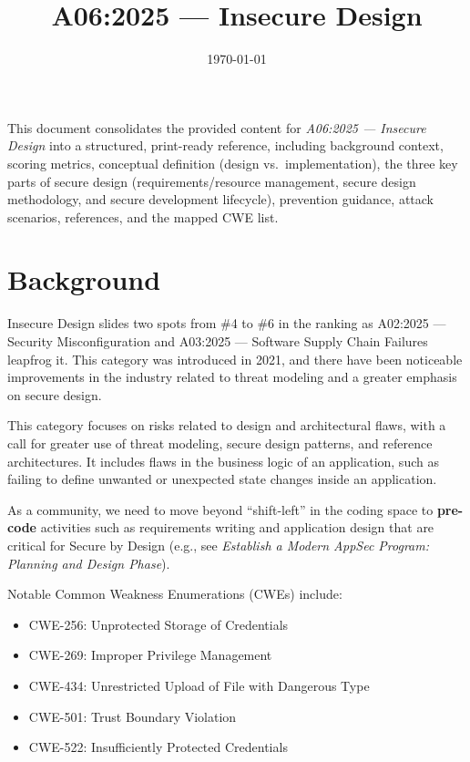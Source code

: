 \documentclass[11pt]{article}
\title{\textbf{A06:2025 — Insecure Design}}
\date{\today}
\author{} %
\begin{document}
\maketitle

\begin{infobox}
This document consolidates the provided content for \textit{A06:2025 — Insecure Design} into a structured, print-ready reference, including background context, scoring metrics, conceptual definition (design vs.\ implementation), the three key parts of secure design (requirements/resource management, secure design methodology, and secure development lifecycle), prevention guidance, attack scenarios, references, and the mapped CWE list.
\end{infobox}

\tableofcontents
\newpage

\section{Background}
Insecure Design slides two spots from \#4 to \#6 in the ranking as A02:2025 --- Security Misconfiguration and A03:2025 --- Software Supply Chain Failures leapfrog it. This category was introduced in 2021, and there have been noticeable improvements in the industry related to threat modeling and a greater emphasis on secure design.

This category focuses on risks related to design and architectural flaws, with a call for greater use of threat modeling, secure design patterns, and reference architectures. It includes flaws in the business logic of an application, such as failing to define unwanted or unexpected state changes inside an application.

As a community, we need to move beyond ``shift-left'' in the coding space to \textbf{pre-code} activities such as requirements writing and application design that are critical for Secure by Design (e.g., see \textit{Establish a Modern AppSec Program: Planning and Design Phase}).

Notable Common Weakness Enumerations (CWEs) include:
\begin{itemize}
  \item CWE-256: Unprotected Storage of Credentials
  \item CWE-269: Improper Privilege Management
  \item CWE-434: Unrestricted Upload of File with Dangerous Type
  \item CWE-501: Trust Boundary Violation
  \item CWE-522: Insufficiently Protected Credentials
\end{itemize}
\end{document}
